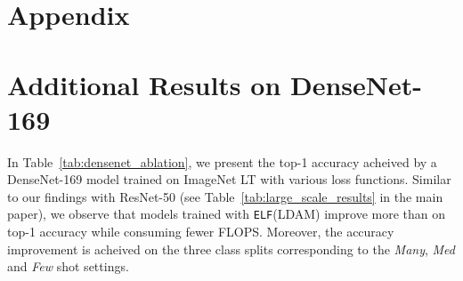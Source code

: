 \documentclass{article}
\newcommand{\method}{\texttt{ELF}\xspace}
\begin{document}



\newpage

\section*{Appendix}
\label{sec:appendix}
\appendix



\section{Additional Results on DenseNet-169}
In Table~\ref{tab:densenet_ablation}, we present the top-1 accuracy acheived by a DenseNet-169 model trained on ImageNet LT with various loss functions. 
Similar to our findings with ResNet-50 (see Table~\ref{tab:large_scale_results} in the main paper), we observe that models trained with \method{}{\scriptsize (LDAM)} improve more than  on top-1 accuracy while consuming fewer FLOPS. Moreover, the accuracy improvement is acheived on the three class splits corresponding to the \textit{Many}, \textit{Med} and \textit{Few} shot settings.
\end{document}
